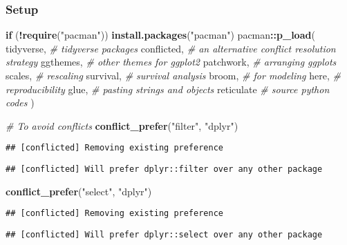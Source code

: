 \documentclass[
]{book}
\newenvironment{Shaded}{\begin{snugshade}}{\end{snugshade}}
\newcommand{\CommentTok}[1]{\textcolor[rgb]{0.56,0.35,0.01}{\textit{#1}}}
\newcommand{\ControlFlowTok}[1]{\textcolor[rgb]{0.13,0.29,0.53}{\textbf{#1}}}
\newcommand{\KeywordTok}[1]{\textcolor[rgb]{0.13,0.29,0.53}{\textbf{#1}}}
\newcommand{\NormalTok}[1]{#1}
\newcommand{\OperatorTok}[1]{\textcolor[rgb]{0.81,0.36,0.00}{\textbf{#1}}}
\newcommand{\StringTok}[1]{\textcolor[rgb]{0.31,0.60,0.02}{#1}}
\begin{document}
\hypertarget{setup-6}{%
\subsubsection{Setup}\label{setup-6}}

\begin{Shaded}
\begin{Highlighting}[]
\ControlFlowTok{if}\NormalTok{ (}\OperatorTok{!}\KeywordTok{require}\NormalTok{(}\StringTok{"pacman"}\NormalTok{)) }\KeywordTok{install.packages}\NormalTok{(}\StringTok{"pacman"}\NormalTok{)}
\NormalTok{pacman}\OperatorTok{::}\KeywordTok{p\_load}\NormalTok{(}
\NormalTok{ tidyverse, }\CommentTok{\# tidyverse packages }
\NormalTok{ conflicted, }\CommentTok{\# an alternative conflict resolution strategy }
\NormalTok{ ggthemes, }\CommentTok{\# other themes for ggplot2 }
\NormalTok{ patchwork, }\CommentTok{\# arranging ggplots}
\NormalTok{ scales, }\CommentTok{\# rescaling }
\NormalTok{ survival, }\CommentTok{\# survival analysis}
\NormalTok{ broom, }\CommentTok{\# for modeling}
\NormalTok{ here, }\CommentTok{\# reproducibility }
\NormalTok{ glue, }\CommentTok{\# pasting strings and objects }
\NormalTok{ reticulate }\CommentTok{\# source python codes}
\NormalTok{)}

\CommentTok{\# To avoid conflicts }
\KeywordTok{conflict\_prefer}\NormalTok{(}\StringTok{"filter"}\NormalTok{, }\StringTok{"dplyr"}\NormalTok{) }
\end{Highlighting}
\end{Shaded}

\begin{verbatim}
## [conflicted] Removing existing preference
\end{verbatim}

\begin{verbatim}
## [conflicted] Will prefer dplyr::filter over any other package
\end{verbatim}

\begin{Shaded}
\begin{Highlighting}[]
\KeywordTok{conflict\_prefer}\NormalTok{(}\StringTok{"select"}\NormalTok{, }\StringTok{"dplyr"}\NormalTok{) }
\end{Highlighting}
\end{Shaded}

\begin{verbatim}
## [conflicted] Removing existing preference
\end{verbatim}

\begin{verbatim}
## [conflicted] Will prefer dplyr::select over any other package
\end{verbatim}
\end{document}
